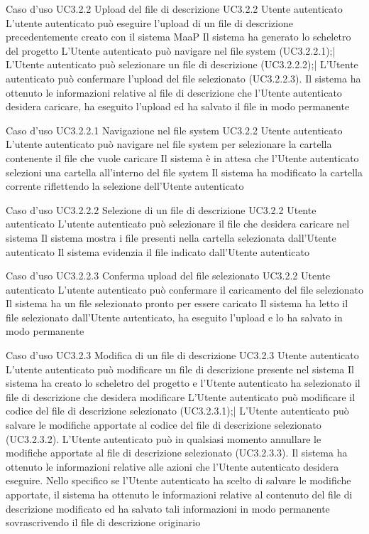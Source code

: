 \UCtitle
{Caso d'uso UC3.2.2}
{Upload del file di descrizione}
\UC
{UC3.2.2}
{Utente autenticato}
{L'utente autenticato può eseguire l'upload di un file di descrizione precedentemente creato con il sistema MaaP}
{Il sistema ha generato lo scheletro del progetto}
\scenario
{L'Utente autenticato può navigare nel file system (UC3.2.2.1);|
L'Utente autenticato può selezionare un file di descrizione (UC3.2.2.2);|
L'Utente autenticato può confermare l'upload del file selezionato (UC3.2.2.3).
}
\post
{Il sistema ha ottenuto le informazioni relative al file di descrizione che l'Utente autenticato desidera caricare, ha eseguito l'upload ed ha salvato il file in modo permanente}

\UCtitle
{Caso d'uso UC3.2.2.1}
{Navigazione nel file system}
\UC
{UC3.2.2}
{Utente autenticato}
{L'utente autenticato può navigare nel file system per selezionare la cartella contenente il file che vuole caricare}
{Il sistema è in attesa che l'Utente autenticato selezioni una cartella all'interno del file system}
\post
{Il sistema ha modificato la cartella corrente riflettendo la selezione dell'Utente autenticato}

\UCtitle
{Caso d'uso UC3.2.2.2}
{Selezione di un file di descrizione}
\UC
{UC3.2.2}
{Utente autenticato}
{L'utente autenticato può selezionare il file che desidera caricare nel sistema}
{Il sistema mostra i file presenti nella cartella selezionata dall'Utente autenticato}
\post
{Il sistema evidenzia il file indicato dall'Utente autenticato}

\UCtitle
{Caso d'uso UC3.2.2.3}
{Conferma upload del file selezionato}
\UC
{UC3.2.2}
{Utente autenticato}
{L'utente autenticato può confermare il caricamento del file selezionato}
{Il sistema ha un file selezionato pronto per essere caricato}
\post
{Il sistema ha letto il file selezionato dall'Utente autenticato, ha eseguito l'upload e lo ha salvato in modo permanente}

\UCtitle
{Caso d'uso UC3.2.3}
{Modifica di un file di descrizione}
\UC
{UC3.2.3}
{Utente autenticato}
{L'utente autenticato può modificare un file di descrizione presente nel sistema}
{Il sistema ha creato lo scheletro del progetto e l'Utente autenticato ha selezionato il file di descrizione che desidera modificare}
\scenario
{L'Utente autenticato può modificare il codice del file di descrizione selezionato (UC3.2.3.1);|
L'Utente autenticato può salvare le modifiche apportate al codice del file di descrizione selezionato (UC3.2.3.2).
}
\estensioni
{L'Utente autenticato può in qualsiasi momento annullare le modifiche apportate al file di descrizione selezionato (UC3.2.3.3).}
\post
{Il sistema ha ottenuto le informazioni relative alle azioni che l'Utente autenticato desidera eseguire. Nello specifico se l'Utente autenticato ha scelto di salvare le modifiche apportate, il sistema ha ottenuto le informazioni relative al contenuto del file di descrizione modificato ed ha salvato tali informazioni in modo permanente sovrascrivendo il file di descrizione originario}

